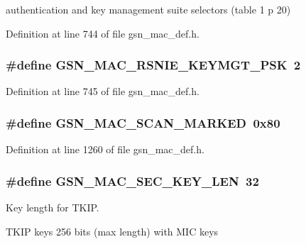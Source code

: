 authentication and key management suite selectors (table 1 p 20) 



Definition at line 744 of file gsn\_\-mac\_\-def.h.

\hypertarget{a00642_ga32b9e4b675a4ef0664691d13d70e1b1b}{
\subsubsection[{GSN\_\-MAC\_\-RSNIE\_\-KEYMGT\_\-PSK}]{\setlength{\rightskip}{0pt plus 5cm}\#define GSN\_\-MAC\_\-RSNIE\_\-KEYMGT\_\-PSK~2}}
\label{a00642_ga32b9e4b675a4ef0664691d13d70e1b1b}


Definition at line 745 of file gsn\_\-mac\_\-def.h.

\hypertarget{a00642_gaa8c55e757f0ecc6201c7a9db8808da39}{
\subsubsection[{GSN\_\-MAC\_\-SCAN\_\-MARKED}]{\setlength{\rightskip}{0pt plus 5cm}\#define GSN\_\-MAC\_\-SCAN\_\-MARKED~0x80}}
\label{a00642_gaa8c55e757f0ecc6201c7a9db8808da39}


Definition at line 1260 of file gsn\_\-mac\_\-def.h.

\hypertarget{a00642_gabedb9ac65e149bcb1082d6926937508f}{
\subsubsection[{GSN\_\-MAC\_\-SEC\_\-KEY\_\-LEN}]{\setlength{\rightskip}{0pt plus 5cm}\#define GSN\_\-MAC\_\-SEC\_\-KEY\_\-LEN~32}}
\label{a00642_gabedb9ac65e149bcb1082d6926937508f}


Key length for TKIP. 

TKIP keys 256 bits (max length) with MIC keys 

